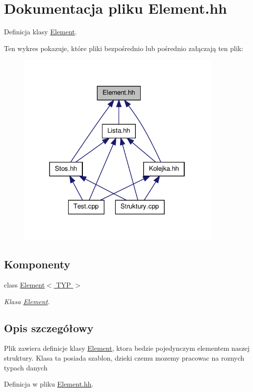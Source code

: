 \hypertarget{_element_8hh}{
\section{Dokumentacja pliku Element.hh}
\label{_element_8hh}
}


Definicja klasy \hyperlink{class_element}{Element}.  


Ten wykres pokazuje, które pliki bezpośrednio lub pośrednio załączają ten plik:
\nopagebreak
\begin{figure}[H]
\begin{center}
\leavevmode
\includegraphics[width=286pt]{_element_8hh__dep__incl}
\end{center}
\end{figure}
\subsection*{Komponenty}
\begin{DoxyCompactItemize}
\item 
class \hyperlink{class_element}{Element$<$ TYP $>$}
\begin{DoxyCompactList}\small\item\em Klasa \hyperlink{class_element}{Element}. \item\end{DoxyCompactList}\end{DoxyCompactItemize}


\subsection{Opis szczegółowy}
Plik zawiera definicje klasy \hyperlink{class_element}{Element}, ktora bedzie pojedynczym elementem naszej struktury. Klasa ta posiada szablon, dzieki czemu mozemy pracowac na roznych typach danych 

Definicja w pliku \hyperlink{_element_8hh_source}{Element.hh}.

